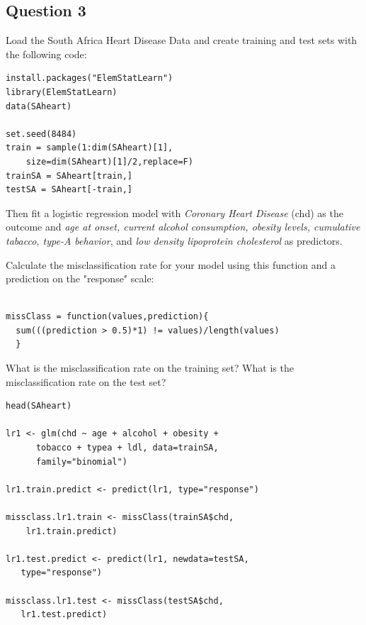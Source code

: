 \documentclass[caret-main.tex]{subfiles}
\begin{document}
\newpage
\subsection*{Question 3}


Load the South Africa Heart Disease Data and create training and test sets with
the following code:
\begin{framed}
\begin{verbatim}
install.packages("ElemStatLearn")
library(ElemStatLearn)
data(SAheart)

set.seed(8484)
train = sample(1:dim(SAheart)[1],
    size=dim(SAheart)[1]/2,replace=F)
trainSA = SAheart[train,]
testSA = SAheart[-train,]

\end{verbatim}
\end{framed}

\noindent Then fit a logistic regression model with \textit{Coronary Heart Disease} (chd) as the
outcome and \textit{age at onset, current alcohol consumption, obesity levels,
cumulative tabacco, type-A behavior}, and \textit{low density lipoprotein cholesterol} as predictors. 



\noindent Calculate the misclassification rate for your model using this
function and a prediction on the "response" scale:
\begin{framed}
\begin{verbatim}

missClass = function(values,prediction){
  sum(((prediction > 0.5)*1) != values)/length(values)
  }
\end{verbatim}
\end{framed}
\noindent What is the misclassification rate on the training set? What is the
misclassification rate on the test set?
\begin{framed}
\begin{verbatim}
head(SAheart)

lr1 <- glm(chd ~ age + alcohol + obesity + 
      tobacco + typea + ldl, data=trainSA, 
      family="binomial")

lr1.train.predict <- predict(lr1, type="response")

missclass.lr1.train <- missClass(trainSA$chd, 
    lr1.train.predict)

lr1.test.predict <- predict(lr1, newdata=testSA, 
   type="response")
   
missclass.lr1.test <- missClass(testSA$chd, 
   lr1.test.predict)
\end{verbatim}
\end{framed}
\end{document}
